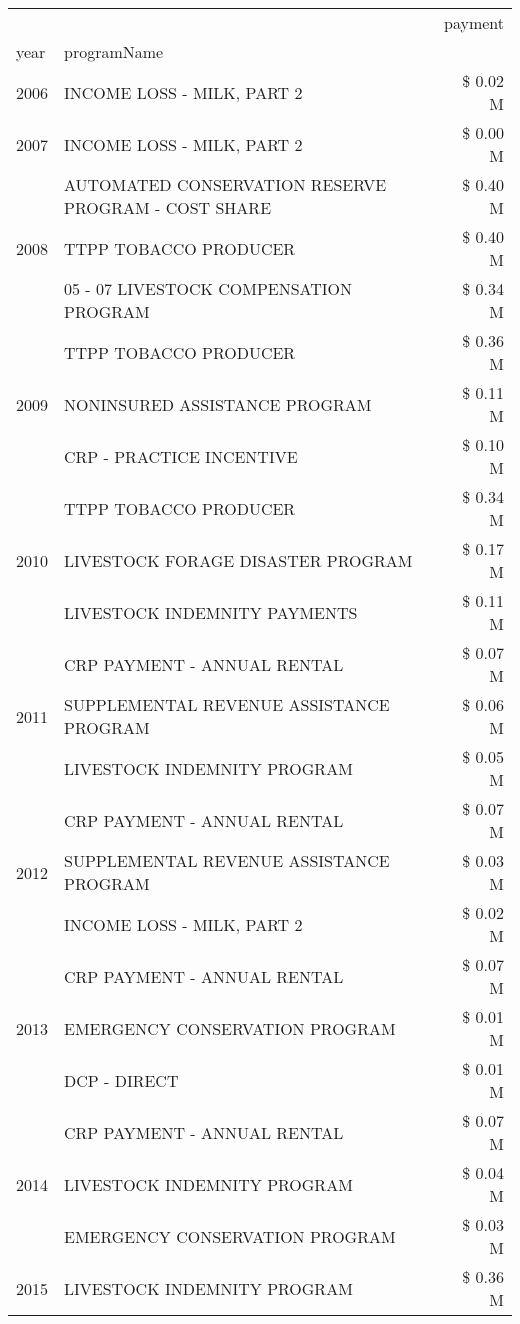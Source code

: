 \begin{tabular}{llr}
\toprule
 &  & payment \\
year & programName &  \\
\midrule
2006 & INCOME LOSS - MILK, PART 2 & \$ 0.02 M \\
\cline{1-3}
2007 & INCOME LOSS - MILK, PART 2 & \$ 0.00 M \\
\cline{1-3}
\multirow[t]{3}{*}{2008} & AUTOMATED CONSERVATION RESERVE PROGRAM - COST SHARE & \$ 0.40 M \\
 & TTPP TOBACCO PRODUCER & \$ 0.40 M \\
 & 05 - 07 LIVESTOCK COMPENSATION PROGRAM & \$ 0.34 M \\
\cline{1-3}
\multirow[t]{3}{*}{2009} & TTPP TOBACCO PRODUCER & \$ 0.36 M \\
 & NONINSURED ASSISTANCE PROGRAM & \$ 0.11 M \\
 & CRP - PRACTICE INCENTIVE & \$ 0.10 M \\
\cline{1-3}
\multirow[t]{3}{*}{2010} & TTPP TOBACCO PRODUCER & \$ 0.34 M \\
 & LIVESTOCK FORAGE DISASTER  PROGRAM & \$ 0.17 M \\
 & LIVESTOCK INDEMNITY PAYMENTS & \$ 0.11 M \\
\cline{1-3}
\multirow[t]{3}{*}{2011} & CRP PAYMENT - ANNUAL RENTAL & \$ 0.07 M \\
 & SUPPLEMENTAL REVENUE ASSISTANCE PROGRAM & \$ 0.06 M \\
 & LIVESTOCK INDEMNITY PROGRAM & \$ 0.05 M \\
\cline{1-3}
\multirow[t]{3}{*}{2012} & CRP PAYMENT - ANNUAL RENTAL & \$ 0.07 M \\
 & SUPPLEMENTAL REVENUE ASSISTANCE PROGRAM & \$ 0.03 M \\
 & INCOME LOSS - MILK, PART 2 & \$ 0.02 M \\
\cline{1-3}
\multirow[t]{3}{*}{2013} & CRP PAYMENT - ANNUAL RENTAL & \$ 0.07 M \\
 & EMERGENCY CONSERVATION PROGRAM & \$ 0.01 M \\
 & DCP - DIRECT & \$ 0.01 M \\
\cline{1-3}
\multirow[t]{3}{*}{2014} & CRP PAYMENT - ANNUAL RENTAL & \$ 0.07 M \\
 & LIVESTOCK INDEMNITY PROGRAM & \$ 0.04 M \\
 & EMERGENCY CONSERVATION PROGRAM & \$ 0.03 M \\
\cline{1-3}
\multirow[t]{2}{*}{2015} & LIVESTOCK INDEMNITY PROGRAM & \$ 0.36 M \\

\end{tabular}
